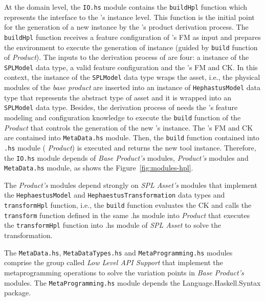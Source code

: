 At the domain level, the \texttt{IO.hs} module contains the \texttt{buildHpl} function which represents the interface to the \hpl{}'s instance level. This function is the initial point for the generation of a new \hpl{} instance by the \hpl{}'s product derivation process.  The \texttt{buildHpl} function receives a feature configuration of \hpl{}'s FM as input and prepares the environment to execute the generation of \hpl{} instance (guided by \texttt{build} function of \textit{\hp{} Product}).  The inputs to the derivation process of \hpl{} are four: a instance of the \texttt{SPLModel} data type, a valid feature configuration and the \hpl's FM and CK.  In this context, the instance of the \texttt{SPLModel} data type wraps the \hp{} asset, i.e., the physical modules of the \textit{\hpl{} base product} are inserted into an instance of \texttt{HephastusModel} data type that represents the abstract type of \hp{} asset and it is wrapped into an \texttt{SPLModel} data type.  Besides, the derivation process of \hpl{} needs the \hpl{}'s feature modeling and configuration knowledge
to execute the \texttt{build} function of the \textit{\hp{} Product} that controls the generation of the new \hpl's instance. 
The \hpl's FM and CK are contained into \texttt{MetaData.hs} module. Then, 
the \texttt{build} function contained into \texttt{\hp.hs} module (\textit{\hp{} Product}) is executed and returns the new \hpl{} tool instance. 
Therefore, the \texttt{IO.hs} module depends of \textit{Base Product's} modules, \textit{\hp{} Product's} modules and \texttt{MetaData.hs} module, as shows the Figure~\ref{fig:modules-hpl}.

The \textit{\hp{} Product's} modules depend strongly on \textit{\hp{} SPL Asset's} modules that implement the \texttt{HephaestusModel} and \texttt{HephaestusTransformation} data types and \texttt{transformHpl} function, i.e., the \texttt{build} function evaluates the CK and calls the \texttt{transform} function defined in the same \hp.hs module into \textit{\hp{} Product} that executes the \texttt{transformHpl} function into \hp.hs module of \textit{ \hp{} SPL Asset} to solve the \hpl{} transformation.

The \texttt{MetaData.hs}, \texttt{MetaDataTypes.hs} and \texttt{MetaProgramming.hs} modules comprise the group called \textit{Low Level API Support} that implement the metaprogramming operations to solve the variation points in \textit{Base Product's} modules. The \texttt{MetaProgramming.hs} module depends the Language.Haskell.Syntax package.

